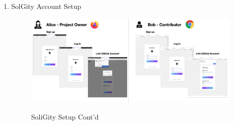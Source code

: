 \documentclass[12pt]{article}
\renewcommand{\_}{\kern-1.5pt\textunderscore\kern-1.5pt}
\begin{document}
\begin{enumerate}
	\item SolGity Account Setup
	      \begin{figure}[H]
		      \centering
		      \includegraphics[width=16.5cm]{graphs/49. setup_4.png}\\
		      \caption{SoliGity Setup Cont'd}
		      \label{fig:setup4}
	      \end{figure}
\end{enumerate}
\end{document}
